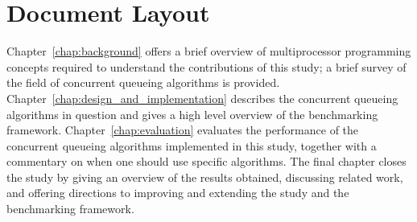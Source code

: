\section{Document Layout}
Chapter~\ref{chap:background} offers a brief overview of multiprocessor
programming concepts required to understand the contributions of this study; a
brief survey of the field of concurrent queueing algorithms is provided.
Chapter~\ref{chap:design_and_implementation} describes the concurrent queueing
algorithms in question and gives a high level overview of the benchmarking
framework.
Chapter~\ref{chap:evaluation} evaluates the performance of the
concurrent queueing algorithms implemented in this study, together with a
commentary on when one should use specific algorithms. The final chapter closes
the study by giving an overview of the results obtained, discussing related
work, and offering directions to improving and extending the study and the
benchmarking framework.